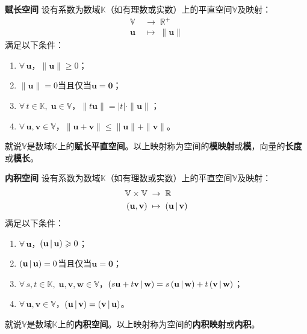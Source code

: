 \documentclass[12pt,UTF8]{ctexbook}
\begin{document}
\begin{appendix}
\begin{df}{\textbf{赋长空间}}
    设有系数为数域$\mathbb{K}$（如有理数或实数）上的平直空间$\mathbb{V}$及映射：
    \begin{align*}
        \mathbb{V} \;&\rightarrow \;\mathbb{R}^+ \\
        \mathbf{u} \;&\mapsto \;\| \mathbf{u} \|
    \end{align*}
    满足以下条件：
    \begin{enumerate}
        \item $\forall \, \mathbf{u}$，$\|\mathbf{u}\| \geqslant 0$；
        \item $\| \mathbf{u} \| = 0$当且仅当$\mathbf{u} = \mathbf{0}$；
        \item $\forall \, t \in \mathbb{K}, \; \mathbf{u}\in \mathbb{V}$，$\| t\mathbf{u}\| = |t|\cdot \|\mathbf{u}\|$；
        \item $\forall \, \mathbf{u}, \mathbf{v} \in \mathbb{V}$，$\|\mathbf{u} + \mathbf{v}\| \leqslant \|\mathbf{u}\| + \|\mathbf{v}\|$。
    \end{enumerate}
    就说$\mathbb{V}$是数域$\mathbb{K}$上的\textbf{赋长平直空间}。以上映射称为空间的\textbf{模映射}或\textbf{模}，向量的\textbf{长度}或\textbf{模长}。
\end{df}

\begin{df}{\textbf{内积空间}}
    设有系数为数域$\mathbb{K}$（如有理数或实数）上的平直空间$\mathbb{V}$及映射：
    \begin{align*}
        \mathbb{V}\times \mathbb{V} \;&\rightarrow \;\mathbb{R} \\
        (\mathbf{u}, \mathbf{v}) \;&\mapsto \; \displaystyle\left( \mathbf{u} \,|\, \mathbf{v} \right)
    \end{align*}
    满足以下条件：
    \begin{enumerate}
        \item $\forall \, \mathbf{u}$，$\displaystyle\left( \mathbf{u} \,|\, \mathbf{u} \right) \geqslant 0$；
        \item $\displaystyle\left( \mathbf{u} \,|\, \mathbf{u} \right) = 0$当且仅当$\mathbf{u} = \mathbf{0}$；
        \item $\forall \, s, t \in \mathbb{K}, \; \mathbf{u}, \mathbf{v}, \mathbf{w}\in \mathbb{V}$，$\displaystyle\left( s\mathbf{u} + t\mathbf{v} \,|\, \mathbf{w} \right) = s\displaystyle\left( \mathbf{u} \,|\, \mathbf{w} \right) + t\displaystyle\left( \mathbf{v} \,|\, \mathbf{w} \right)$；
        \item $\forall \, \mathbf{u}, \mathbf{v} \in \mathbb{V}$，$\displaystyle\left( \mathbf{u} \,|\, \mathbf{v} \right) = \displaystyle\left( \mathbf{v} \,|\, \mathbf{u} \right)$。
    \end{enumerate}
    就说$\mathbb{V}$是数域$\mathbb{K}$上的\textbf{内积空间}。以上映射称为空间的\textbf{内积映射}或\textbf{内积}。
\end{df}


\end{appendix}
\end{document}

